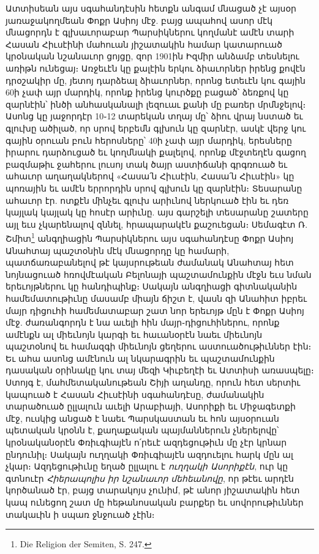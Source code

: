 \documentclass{article}
\begin{document}
{Ատտիսեան այս սգահանդէսին հետքն անգամ մնացած չէ այսօր յառաջակողմեան Փոքր Ասիոյ մէջ. բայց ապահով ասոր մէկ մնացորդն է գլխաւորաբար Պարսիկներու կողմանէ ամէն տարի Հասան Հիւսէինի մահուան յիշատակին համար կատարուած կրօնական նշանաւոր ցոյցը, զոր 1901ին Իզմիր անձամբ տեսնելու առիթն ունեցայ։ Առջեւէն կը քալէին երկու ձիաւորներ իրենց քովէն դրօշակիր մը, յետոյ դարձեալ ձիաւորներ, որոնց ետեւէն կու գային 60ի չափ այր մարդիկ, որոնք իրենց կուրծքը բացած՝ ձեռքով կը զարնէին՝ ինծի անհասկանալի լեզուաւ քանի մը բառեր մրմնջելով։ Ասոնց կը յաջորդէր 10֊12 տարեկան տղայ մը՝ ձիու վրայ նստած եւ գլուխը ածիլած, որ սրով երբեմն գլխուն կը զարնէր, ասկէ վերջ կու գային օրուան բուն հերոսները՝ 40ի չափ այր մարդիկ, երեսները իրարու դարձուցած եւ կողմնակի քալելով, որոնք մէջտեղէն գացող բազմաթիւ ջահերու լուսոյ տակ ծայր աստիճանի գրգռուած եւ ահաւոր աղաղակներով «Հասա՛ն Հիւսէին, Հասա՛ն Հիւսէին» կը պոռային եւ ամէն երրորդին սրով գլխուն կը զարնէին։ Տեսարանը ահաւոր էր. ոտքէն մինչեւ գլուխ արիւնով ներկուած էին եւ դեռ կայլակ կայլակ կը հոսէր արիւնը. այս գարշելի տեսարանը շատերը այլ եւս չկարենալով զննել, հրապարակէն քաշուեցան։ Սեմագէտ Ռ. Շմիտ\footnote{Die Religion der Semiten, S. 247.} անգղիացին Պարսիկներու այս սգահանդէսը Փոքր Ասիոյ Անահտայ պաշտօնին մէկ մնացորդը կը համարի, պատճառաբանելով թէ կայսրութեան ժամանակ Անահտայ հետ նոյնացուած հռովմէական Բելոնայի պաշտամունքին մէջն եւս նման երեւոյթներու կը հանդիպինք։ Սակայն անգղիացի գիտնականին համեմատութիւնը մասամբ միայն ճիշտ է, վասն զի Անահիտ իբրեւ մայր դիցուհի համեմատաբար շատ նոր երեւոյթ մըն է Փոքր Ասիոյ մէջ. ժառանգորդն է նա աւելի հին մայր֊դիցուհիներու, որոնք ամէնքն ալ միեւնոյն կարգի եւ հաւանօրէն նաեւ միեւնոյն պաշտօնով եւ համազգի միեւնոյն ցեղերու աստուածութիւններ էին։ Եւ ահա ասոնց ամէնուն ալ նկարագրին եւ պաշտամունքին դասական օրինակը կու տայ մեզի Կիւբեղէի եւ Ատտիսի առասպելը։ Ստոյգ է, մահմետականութեան Շիյի աղանդը, որուն հետ սերտիւ կապուած է Հասան Հիւսէինի սգահանդէսը, ժամանակին տարածուած ըլլալուն աւելի Արաբիայի, Ասորիքի եւ Միջագետքի մէջ, ուսկից անցած է նաեւ Պարսկաստան եւ հոն այսօրուան պետական կրօնն է, քաղաքական պայմաններուն չներելովը՝ կրօնականօրէն Փռիւգիայէն ո՛րեւէ ազդեցութիւն մը չէր կրնար ընդունիլ։ Սակայն ուղղակի Փռիւգիայէն ազդուելու հարկ մըն ալ չկար։ Ազդեցութիւնը եղած ըլլալու է \emph{ուղղակի Ասորիքէն}, ուր կը գտնուէր \emph{Հիերապոլիս իր նշանաւոր մեհեանովը}, որ թէեւ արդէն կործանած էր, բայց տարակոյս չունիմ, թէ անոր յիշատակին հետ կապ ունեցող շատ մը հեթանոսական բարքեր եւ սովորութիւններ տակաւին ի սպառ ջնջուած չէին։

}
\end{document}
